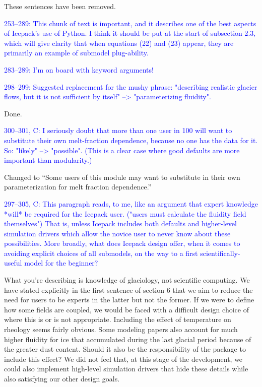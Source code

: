 \documentclass{article}
\theoremstyle{definition}
\theoremstyle{plain}
\begin{document}
These sentences have been removed.

\textcolor{blue}{253--289:  This chunk of text is important, and it describes one of the best aspects of Icepack's use of Python.  I think it should be put at the start of subsection 2.3, which will give clarity that when equations (22) and (23) appear, they are primarily an example of submodel plug-ability.}

\textcolor{blue}{283--289:  I'm on board with keyword arguments!}

\textcolor{blue}{298--299:  Suggested replacement for the mushy phrase: "describing realistic glacier flows, but it is not sufficient by itself" --> "parameterizing fluidity".}

Done.

\textcolor{blue}{300--301, C:  I seriously doubt that more than one user in 100 will want to substitute their own melt-fraction dependence, because no one has the data for it.  So: "likely" --> "possible".  (This is a clear case where good defaults are more important than modularity.)}

Changed to ``Some users of this module may want to substitute in their own parameterization for melt fraction dependence.''

\textcolor{blue}{297--305, C:  This paragraph reads, to me, like an argument that expert knowledge *will* be required for the Icepack user.  ("users must calculate the fluidity field themselves")  That is, unless Icepack includes both defaults and higher-level simulation drivers which allow the novice user to never know about these possibilities.  More broadly, what does Icepack design offer, when it comes to avoiding explicit choices of all submodels, on the way to a first scientifically-useful model for the beginner?}

What you're describing is knowledge of glaciology, not scientific computing.
We have stated explicitly in the first sentence of section 6 that we aim to reduce the need for users to be experts in the latter but not the former.
If we were to define how some fields are coupled, we would be faced with a difficult design choice of where this is or is not appropriate.
Including the effect of temperature on rheology seems fairly obvious.
Some modeling papers also account for much higher fluidity for ice that accumulated during the last glacial period because of the greater dust content.
Should it also be the responsibility of the package to include this effect?
We did not feel that, at this stage of the development, we could also implement high-level simulation drivers that hide these details while also satisfying our other design goals.
\end{document}

